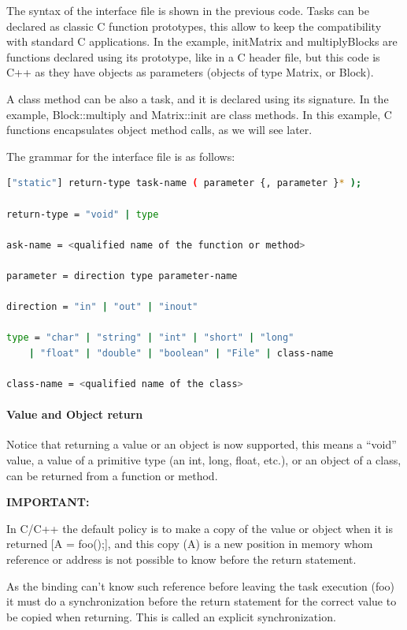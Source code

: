 The syntax of the interface file is shown in the previous code. Tasks can be declared as classic C function prototypes, this allow to keep the compatibility with standard C applications. In the example, initMatrix and multiplyBlocks are functions declared using its prototype, like in a C header file, but this code is C++ as they have objects as parameters (objects of type Matrix, or Block).

A class method can be also a task, and it is declared using its signature. In the example, Block::multiply and Matrix::init are class methods. In this example, C functions encapsulates object method calls, as we will see later.

The grammar for the interface file is as follows:

\begin{lstlisting}[language=bash]
["static"] return-type task-name ( parameter {, parameter }* );

return-type = "void" | type

ask-name = <qualified name of the function or method>

parameter = direction type parameter-name

direction = "in" | "out" | "inout"

type = "char" | "string" | "int" | "short" | "long"
    | "float" | "double" | "boolean" | "File" | class-name

class-name = <qualified name of the class>
\end{lstlisting}

       
\paragraph{Value and Object return}
Notice that returning a value or an object is now supported, this means a ``void'' value, a value of a primitive type (an int, long, float, etc.), or an object of a class, can be returned from a function or method.

{\bf IMPORTANT:}

In C/C++ the default policy is to make a copy of the value or object when it is returned [A = foo();], and this copy (A) is a new position in memory whom reference or address is not possible to know before the return statement.

As the binding can’t know such reference before leaving the task execution (foo) it must do a synchronization before the return statement for the correct value to be copied when returning. This is called an explicit synchronization.

